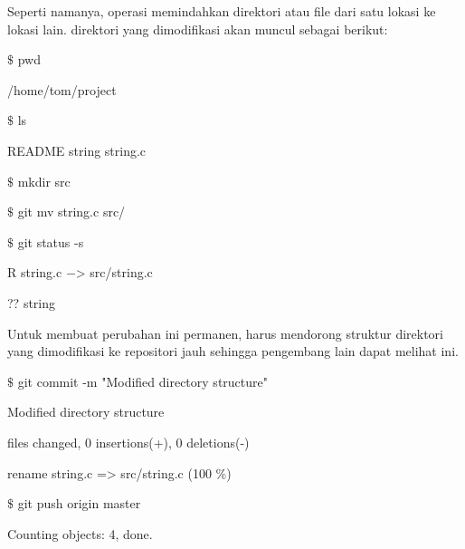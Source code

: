 Seperti namanya, operasi memindahkan direktori atau file dari satu lokasi ke lokasi lain. direktori yang dimodifikasi akan muncul sebagai berikut: \par
\noindent 
\vspace{10pt}
\noindent 
{\fontsize{10pt}{10pt} $  \$  $ pwd} \par
\noindent 
{\fontsize{10pt}{10pt}\selectfont /home/tom/project} \par
\noindent 
\vspace{10pt}
\noindent 
{\fontsize{10pt}{10pt} $  \$  $ ls} \par
\noindent 
{\fontsize{10pt}{10pt}\selectfont README string string.c} \par
\noindent 
\vspace{10pt}
\noindent 
{\fontsize{10pt}{10pt} $  \$  $ mkdir src} \par
\noindent 
\vspace{10pt}
\noindent 
{\fontsize{10pt}{10pt} $  \$  $ git mv string.c src/} \par
\noindent 
\vspace{10pt}
\noindent 
{\fontsize{10pt}{10pt} $  \$  $ git status -s} \par
\noindent 
{\fontsize{10pt}{10pt}\selectfont R string.c  $ - $> src/string.c} \par
\noindent 
{\fontsize{10pt}{10pt}\selectfont ?? string} \par
\vspace{16pt}
Untuk membuat perubahan ini permanen, harus mendorong struktur direktori yang dimodifikasi ke repositori jauh sehingga pengembang lain dapat melihat ini. \par
{} $  \$  $ git commit -m "Modified directory structure" \par
\vspace{12pt}
\noindent 
[master 7d9ea97] Modified directory structure \par
{} files changed, 0 insertions(+), 0 deletions(-) \par
\noindent 
rename string.c => src/string.c (100 $  \%  $) \par
\vspace{12pt}
 $  \$  $ git push origin master \par
\noindent 
Counting objects: 4, done. \par
